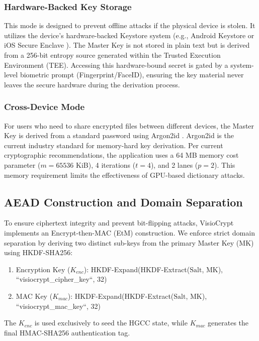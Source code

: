 \documentclass[runningheads]{llncs}
\begin{document}
\subsubsection{Hardware-Backed Key Storage}
This mode is designed to prevent offline attacks if the physical device is stolen. It utilizes the device's hardware-backed Keystore system (e.g., Android Keystore or iOS Secure Enclave \cite{pinto2019}). The Master Key is not stored in plain text but is derived from a 256-bit entropy source generated within the Trusted Execution Environment (TEE). Accessing this hardware-bound secret is gated by a system-level biometric prompt (Fingerprint/FaceID), ensuring the key material never leaves the secure hardware during the derivation process.

\subsubsection{Cross-Device Mode}
For users who need to share encrypted files between different devices, the Master Key is derived from a standard password using Argon2id \cite{biryukov2016}. Argon2id is the current industry standard for memory-hard key derivation. Per current cryptographic recommendations, the application uses a 64 MB memory cost parameter ($m = 65536$ KiB), 4 iterations ($t = 4$), and 2 lanes ($p = 2$). This memory requirement limits the effectiveness of GPU-based dictionary attacks.

\subsection{AEAD Construction and Domain Separation}
To ensure ciphertext integrity and prevent bit-flipping attacks, VisioCrypt implements an Encrypt-then-MAC (EtM) construction. We enforce strict domain separation by deriving two distinct sub-keys from the primary Master Key (MK) using HKDF-SHA256:
\begin{enumerate}
    \item Encryption Key ($K_{enc}$): HKDF-Expand(HKDF-Extract($\text{Salt}$, MK), ``visiocrypt\_cipher\_key``, 32)
    \item MAC Key ($K_{mac}$): HKDF-Expand(HKDF-Extract($\text{Salt}$, MK), ``visiocrypt\_mac\_key``, 32)
\end{enumerate}
The $K_{enc}$ is used exclusively to seed the HGCC state, while $K_{mac}$ generates the final HMAC-SHA256 authentication tag.
\end{document}

